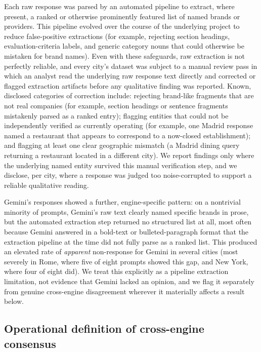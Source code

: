 \documentclass[11pt]{article}
\begin{document}
Each raw response was parsed by an automated pipeline to extract, where present, a
ranked or otherwise prominently featured list of named brands or providers. This
pipeline evolved over the course of the underlying project to reduce false-positive
extractions (for example, rejecting section headings, evaluation-criteria labels, and
generic category nouns that could otherwise be mistaken for brand names). Even with
these safeguards, raw extraction is not perfectly reliable, and every city's dataset was
subject to a manual review pass in which an analyst read the underlying raw response
text directly and corrected or flagged extraction artifacts before any qualitative
finding was reported. Known, disclosed categories of correction include: rejecting
brand-like fragments that are not real companies (for example, section headings or
sentence fragments mistakenly parsed as a ranked entry); flagging entities that could
not be independently verified as currently operating (for example, one Madrid response
named a restaurant that appears to correspond to a now-closed establishment); and
flagging at least one clear geographic mismatch (a Madrid dining query returning a
restaurant located in a different city). We report findings only where the underlying
named entity survived this manual verification step, and we disclose, per city, where a
response was judged too noise-corrupted to support a reliable qualitative reading.

Gemini's responses showed a further, engine-specific pattern: on a nontrivial minority
of prompts, Gemini's raw text clearly named specific brands in prose, but the automated
extraction step returned no structured list at all, most often because Gemini answered
in a bold-text or bulleted-paragraph format that the extraction pipeline at the time
did not fully parse as a ranked list. This produced an elevated rate of
\emph{apparent} non-response for Gemini in several cities (most severely in Rome, where
five of eight prompts showed this gap, and New York, where four of eight did). We treat
this explicitly as a pipeline extraction limitation, not evidence that Gemini lacked an
opinion, and we flag it separately from genuine cross-engine disagreement wherever it
materially affects a result below.

\subsection{Operational definition of cross-engine consensus}
\end{document}
